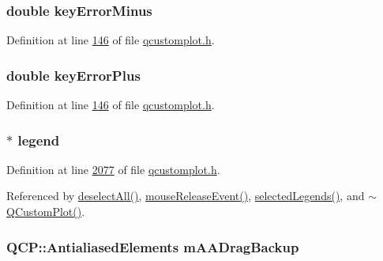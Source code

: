 \hypertarget{a00116_a7d90a6258f6d24ad254245076e5beac7}{
\subsubsection[{key\+Error\+Minus}]{\setlength{\rightskip}{0pt plus 5cm}double key\+Error\+Minus}}\label{a00116_a7d90a6258f6d24ad254245076e5beac7}


Definition at line \hyperlink{a00116_source_l00146}{146} of file \hyperlink{a00116_source}{qcustomplot.\+h}.

\hypertarget{a00116_a1d47938cd7209297ef861cf01816d89f}{
\subsubsection[{key\+Error\+Plus}]{\setlength{\rightskip}{0pt plus 5cm}double key\+Error\+Plus}}\label{a00116_a1d47938cd7209297ef861cf01816d89f}


Definition at line \hyperlink{a00116_source_l00146}{146} of file \hyperlink{a00116_source}{qcustomplot.\+h}.

\hypertarget{a00116_a75acd427ec48e9a9d2ae6a17817cc490}{
\subsubsection[{legend}]{$\ast$ legend}}\label{a00116_a75acd427ec48e9a9d2ae6a17817cc490}


Definition at line \hyperlink{a00116_source_l02077}{2077} of file \hyperlink{a00116_source}{qcustomplot.\+h}.



Referenced by \hyperlink{a00115_source_l07189}{deselect\+All()}, \hyperlink{a00115_source_l07691}{mouse\+Release\+Event()}, \hyperlink{a00115_source_l07171}{selected\+Legends()}, and \hyperlink{a00115_source_l05836}{$\sim$\+Q\+Custom\+Plot()}.

\hypertarget{a00116_ac6e9f4d75a28eb37ee454e1907655e8b}{
\subsubsection[{m\+A\+A\+Drag\+Backup}]{\setlength{\rightskip}{0pt plus 5cm}Q\+C\+P\+::\+Antialiased\+Elements m\+A\+A\+Drag\+Backup}}\label{a00116_ac6e9f4d75a28eb37ee454e1907655e8b}


